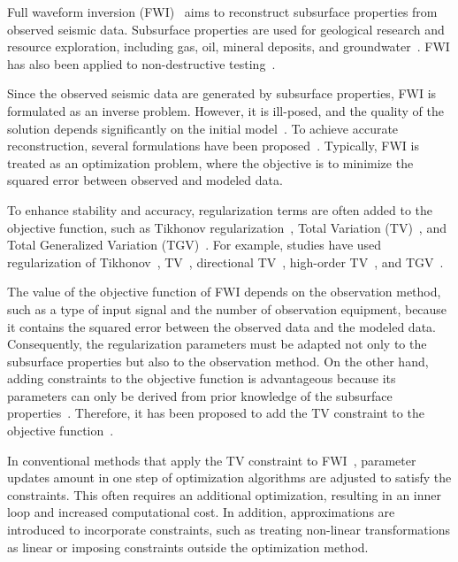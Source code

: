 Full waveform inversion (FWI)~\cite{FWI0,FWI1} aims to reconstruct subsurface properties from observed seismic data.
Subsurface properties are used for geological research and resource exploration, including gas, oil, mineral deposits, and groundwater~\cite{FWI1,FWIApplicationGroundwater0,FWIApplicationGroundwater1}.
FWI has also been applied to non-destructive testing~\cite{FWIApplicationNonDestructiveTesting0,FWIApplicationNonDestructiveTesting1}.

Since the observed seismic data are generated by subsurface properties, FWI is formulated as an inverse problem.
However, it is ill-posed, and the quality of the solution depends significantly on the initial model~\cite{FWI1}.
To achieve accurate reconstruction, several formulations have been proposed~\cite{FWI0,CustomFWI0,CustomFWI1,CustomFWI2,CustomFWI3,CustomFWI4,CustomFWI5}.
Typically, FWI is treated as an optimization problem, where the objective is to minimize the squared error between observed and modeled data.

To enhance stability and accuracy, regularization terms are often added to the objective function, such as Tikhonov regularization~\cite{tikhonov}, Total Variation (TV)~\cite{TV}, and Total Generalized Variation (TGV)~\cite{TGV}.
For example, studies have used regularization of Tikhonov~\cite{FWI-with-tikhonov-regularization}, TV~\cite{FWI-with-TV-regularization}, directional TV~\cite{FWI-with-directional-TV-regularization}, high-order TV~\cite{FWI-with-high-order-TV-regularization}, and TGV~\cite{FWI-with-TGV-regularization}.

The value of the objective function of FWI depends on the observation method, such as a type of input signal and the number of observation equipment, because it contains the squared error between the observed data and the modeled data.
Consequently, the regularization parameters must be adapted not only to the subsurface properties but also to the observation method.
On the other hand, adding constraints to the objective function is advantageous because its parameters can only be derived from prior knowledge of the subsurface properties~\cite{constraints-vs-penalties-in-FWI}.
Therefore, it has been proposed to add the TV constraint to the objective function~\cite{FWI-with-TV-constraint,FWI-with-TV-constraint2,FWI-with-TV-constraint3}.

In conventional methods that apply the TV constraint to FWI~\cite{FWI-with-TV-constraint,FWI-with-TV-constraint2}, parameter updates amount in one step of optimization algorithms are adjusted to satisfy the constraints.
This often requires an additional optimization, resulting in an inner loop and increased computational cost.
In addition, approximations are introduced to incorporate constraints, such as treating non-linear transformations as linear or imposing constraints outside the optimization method.


